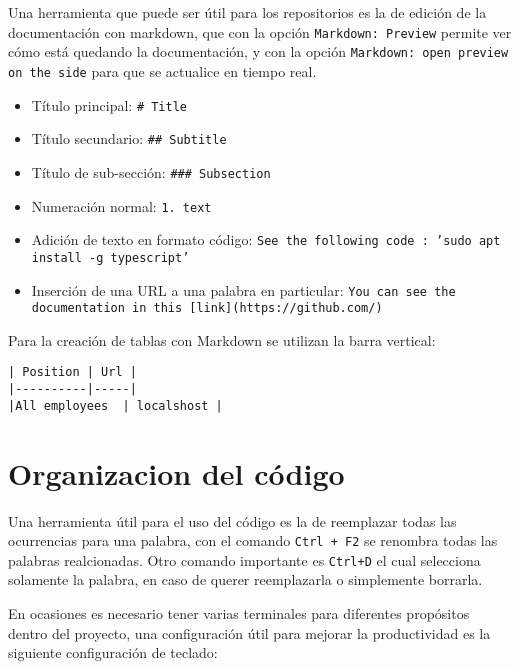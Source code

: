Una herramienta que puede ser útil para los repositorios es la de edición de la documentación con markdown, que con la opción \texttt{Markdown: Preview} permite ver cómo está quedando la documentación, y con la opción \texttt{Markdown: open preview on the side} para que se actualice en tiempo real.
\begin{itemize}
    \item Título principal: \texttt{\# Title} \\
    \item Título secundario: \texttt{\#\# Subtitle} \\
    \item Título de sub-sección: \texttt{\#\#\# Subsection} \\
    \item Numeración normal: \texttt{1. text}
    \item Adición de texto en formato código: \texttt{See the following code : 'sudo apt install -g typescript'} \\
    \item Inserción de una URL a una palabra en particular: \texttt{You can see the documentation in this [link](https://github.com/) } \\
\end{itemize}

Para la creación de tablas con Markdown se utilizan la barra vertical:


\begin{verbatim}
| Position | Url |
|----------|-----|
|All employees  | localshost |
\end{verbatim}








\section{Organizacion del código}

Una herramienta útil para el uso del código es la de reemplazar todas las ocurrencias para una palabra, con el comando \texttt{Ctrl + F2} se renombra todas las palabras realcionadas. Otro comando importante es \texttt{Ctrl+D} el cual selecciona solamente la palabra, en caso de querer reemplazarla o simplemente borrarla.


En ocasiones es necesario tener varias terminales para diferentes propósitos dentro del proyecto, una configuración útil para mejorar la productividad es la siguiente configuración de teclado:


